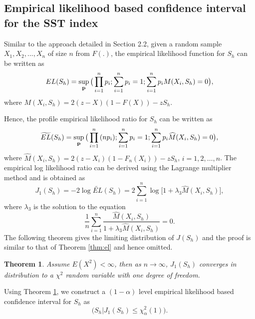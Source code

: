 \documentclass[11pt]{article}
\newtheorem{theorem}{Theorem}
\begin{document}
\subsection{Empirical likelihood based confidence interval for the SST index}

   Similar to the approach detailed in Section 2.2, given a random sample $X_1,X_2,...,X_n$ of size $n$ from $F(.)$,  the empirical likelihood function for $S_{h}$ can be written as
\begin{equation*}
  {EL}(S_{h})=\sup_{\bf p} \big(\prod_{i=1}^{n}{p_i};\sum_{i=1}^{n}{p_i}=1;\sum_{i=1}^{n}{p_{i} {M}(X_i,S_{h})}=0\big),
\end{equation*}
where ${M}(X_i,S_{h})=2(z-X)(1-F(X))-zS_{h}$.

Hence, the profile empirical likelihood ratio for $S_{h}$ can be written as
\begin{equation*}
  \widetilde{EL}(S_{h})=\sup_{\bf p} \big(\prod_{i=1}^{n}{(np_i)};\sum_{i=1}^{n}{p_i}=1;\sum_{i=1}^{n}{p_{i} \widehat{M}(X_i,S_{h})}=0\big),
\end{equation*}
where $\widehat{M}(X_i,S_{h})=2(z-X_i)(1-F_{n}(X_i))-zS_{h}$, $i=1,2,\ldots,n$.
The empirical log likelihood ratio can be  derived using the Lagrange multiplier method and is obtained as
   $$J_1(S_{h})=-2\log  \widetilde{EL}(S_{h})=2\sum_{i=1}^{n}\log\big[1+\lambda_{3} \widehat{M}(X_i,S_{h})\big],$$
where $\lambda_{3}$ is the solution to the equation
   $$\frac{1}{n}\sum_{i=1}^{n}{\frac{\widehat{M}(X_i,S_{h})}{1+\lambda_{3} \widehat{M}(X_i,S_{h})}}=0.$$
The following theorem gives the limiting distribution of $J(S_{h})$ and the proof is similar to that of Theorem \ref{thm:el} and hence omitted.
\begin{theorem}\label{thm_sstel}
 Assume  $E(X^2)<\infty$, then as $n\rightarrow \infty$, $J_1(S_{h})$ converges in distribution to a  $\chi^2$ random variable with one degree of freedom.
\end{theorem}

Using Theorem \ref{thm_sstel}, we construct a $(1-\alpha)$ level empirical likelihood  based confidence interval for $S_h$  as
\begin{equation*}
  \big(S_h|J_1(S_h) \le\chi_{\alpha}^2(1)\big).
\end{equation*}
\end{document}
